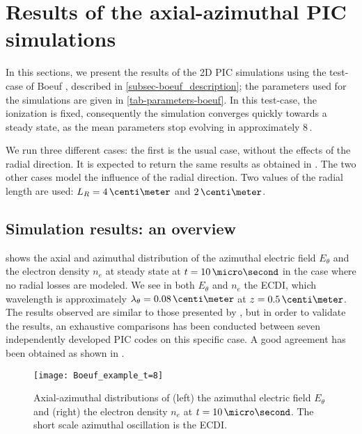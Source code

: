 
\section{Results of the axial-azimuthal PIC simulations}
  \label{sec-Zthetaresults}
  In this sections, we present the results of the \ac{2D} \ac{PIC} simulations using the test-case of Boeuf \citep{boeuf2018}, described in \cref{subsec-boeuf_description}\string; the parameters used for the simulations are given in \cref{tab-parameters-boeuf}.
  In this test-case, the ionization is fixed, consequently the simulation converges quickly towards a steady state, as the mean parameters stop evolving in approximately 8\,\micro\second.
  
  We run three different cases\string:
  the first is the usual case, without the effects of the radial direction.
  It is expected to return the same results as obtained in \citet{boeuf2018}.
  The two other cases model the influence of the radial direction.
  Two values of the radial length are used\string: $L_R=4\,\centi\meter$ and $2\,\centi\meter$.

  
  \subsection{Simulation results\string: an overview} \label{subsec-boeuf-overview}
     shows the axial and azimuthal distribution of the azimuthal electric field $E_{\theta}$ and the electron density $n_e$ at steady state at $t=10\,\micro\second$ in the case where no radial losses are modeled.
    We see in both $E_{\theta}$ and $n_e$ the \ac{ECDI}, which wavelength is approximately $\lambda_{\theta} = 0.08\,\centi\meter$ at $z=0.5\,\centi\meter$.
    The results observed are similar to those presented by \citet{boeuf2018}, but in order to validate the results, an exhaustive comparisons has been conducted between seven independently developed \ac{PIC} codes on this specific case.
    A good agreement has been obtained as shown in \citet{charoy2019}.
    

    \begin{figure}[hbt]
      \centering
      \texttt{[image: Boeuf\_example\_t=8]}
      \caption{ Axial-azimuthal distributions of (left) the azimuthal electric field $E_{\theta}$ and (right) the electron density $n_e$ at $t=10\,\micro\second$. The short scale azimuthal oscillation is the \acs{ECDI}.} 
      \label{fig-overview_boeuf_neEx}
    \end{figure}

